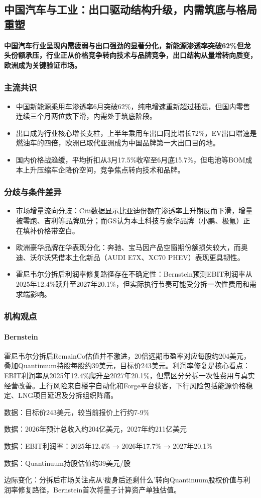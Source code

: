 \documentclass[11pt]{ctexart}
\begin{document}
\subsection{中国汽车与工业：出口驱动结构升级，内需筑底与格局重塑}
\textbf{中国汽车行业呈现内需疲弱与出口强劲的显著分化，新能源渗透率突破62\%但龙头份额承压，行业正从价格竞争转向技术与品牌竞争，出口结构从量增转向质变，欧洲成为关键验证市场。}
\subsubsection*{主流共识}
\begin{itemize}
  \item 中国新能源乘用车渗透率6月突破62\%，纯电增速重新超过插混，但国内零售连续三个月两位数下滑，内需处于筑底阶段。
  \item 出口成为行业核心增长支柱，上半年乘用车出口同比增长72\%，EV出口增速是燃油车的四倍，欧洲已取代亚洲成为中国品牌第一大出口目的地。
  \item 国内价格战趋缓，平均折扣从3月17.5\%收窄至6月底15.7\%，但电池等BOM成本上升压缩车企降价空间，竞争焦点转向技术和品牌。
\end{itemize}
\subsubsection*{分歧与条件差异}
\begin{itemize}
  \item 市场增量流向分歧：Citi数据显示比亚迪份额在渗透率上升期反而下滑，增量被零跑、吉利等品牌瓜分；而GS认为本土科技与豪华品牌（小鹏、极氪）正在填补价格带空白。
  \item 欧洲豪华品牌在华表现分化：奔驰、宝马因产品空窗期份额损失较大，而奥迪、沃尔沃凭借本土化新品（AUDI E7X、XC70 PHEV）表现更具韧性。
  \item 霍尼韦尔分拆后利润率修复路径存在不确定性：Bernstein预测EBIT利润率从2025年12.4\%跃升至2027年20.1\%，但实际执行节奏可能受分拆一次性费用和需求端影响。
\end{itemize}
\subsubsection*{机构观点}
\paragraph{Bernstein} 霍尼韦尔分拆后RemainCo估值并不激进，20倍远期市盈率对应每股约204美元，叠加Quantinuum持股每股约39美元，目标价243美元。利润率修复是核心看点：EBIT利润率从2025年12.4\%爬升至2027年20.1\%，但需区分分拆一次性费用与真实经营改善。上行风险来自楼宇自动化和Forge平台获客，下行风险包括能源价格稳定、LNG项目延迟及分拆组织阵痛。
{\small\color{refgray}数据：目标价243美元，较当前报价上行约7-9\%\par}
{\small\color{refgray}数据：2026年预计总收入约204亿美元，2027年约211亿美元\par}
{\small\color{refgray}数据：EBIT利润率：2025年12.4\% → 2026年17.7\% → 2027年20.1\%\par}
{\small\color{refgray}数据：Quantinuum持股估值约39美元/股\par}
{\small\color{refgray}边际变化：分拆后市场关注点从‘瘦身后还剩什么’转向Quantinuum股权价值与利润率修复路径，Bernstein首次将量子计算资产单独估值。\par}
\end{document}
